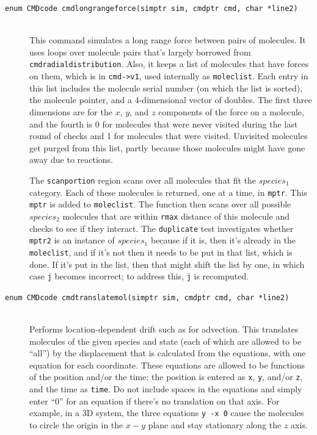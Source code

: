 \documentclass {scrbook}
\newcommand {\ttt} {\texttt}
\begin{document}
\begin{description}
\item[\ttt{enum CMDcode cmdlongrangeforce(simptr sim, cmdptr cmd, char *line2)}]
\hfill \\
This command simulates a long range force between pairs of molecules. It uses loops over molecule pairs that's largely borrowed from \ttt{cmdradialdistribution}. Also, it keeps a list of molecules that have forces on them, which is in \ttt{cmd->v1}, used internally as \ttt{moleclist}. Each entry in this list includes the molecule serial number (on which the list is sorted), the molecule pointer, and a 4-dimensional vector of doubles. The first three dimensions are for the $x$, $y$, and $z$ components of the force on a molecule, and the fourth is 0 for molecules that were never visited during the last round of checks and 1 for molecules that were visited. Unvisited molecules get purged from this list, partly because those molecules might have gone away due to reactions.

The \ttt{scanportion} region scans over all molecules that fit the $species_1$ category. Each of these molecules is returned, one at a time, in \ttt{mptr}. This \ttt{mptr} is added to \ttt{moleclist}. The function then scans over all possible $species_2$ molecules that are within \ttt{rmax} distance of this molecule and checks to see if they interact. The \ttt{duplicate} test investigates whether \ttt{mptr2} is an instance of $species_1$ because if it is, then it's already in the \ttt{moleclist}, and if it's not then it needs to be put in that list, which is done. If it's put in the list, then that might shift the list by one, in which case \ttt{j} becomes incorrect; to address this, \ttt{j} is recomputed.

\item[\ttt{enum CMDcode cmdtranslatemol(simptr sim, cmdptr cmd, char *line2)}]
\hfill \\
Performs location-dependent drift such as for advection. This translates molecules of the given species and state (each of which are allowed to be ``all'') by the displacement that is calculated from the equations, with one equation for each coordinate. These equations are allowed to be functions of the position and/or the time; the position is entered as \ttt{x}, \ttt{y}, and/or \ttt{z}, and the time as \ttt{time}. Do not include spaces in the equations and simply enter ``0'' for an equation if there's no translation on that axis. For example, in a 3D system, the three equations \ttt{y -x 0} cause the molecules to circle the origin in the $x-y$ plane and stay stationary along the $z$ axis.


\end{description}
\end{document}
